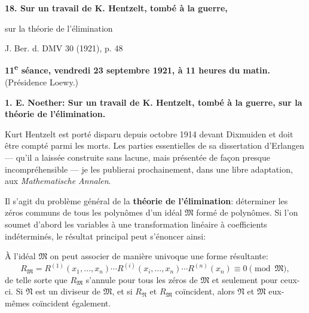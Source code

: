 \begin{center}
{\Large\bfseries 18. Sur un travail de K. Hentzelt, tombé à la guerre,\par sur la théorie de l'élimination}\par
\vspace{1.2em}
J. Ber. d. DMV 30 (1921), p. 48
\end{center}

\begin{center}
\textbf{11\textsuperscript{e} séance, vendredi 23 septembre 1921, à 11 heures du matin.}\\
(Présidence Loewy.)
\end{center}

\textbf{1. E. Noether: Sur un travail de K. Hentzelt, tombé à la guerre, sur la théorie de l'élimination.}

Kurt Hentzelt est porté disparu depuis octobre 1914 devant Dixmuiden et doit être compté parmi les morts. Les parties essentielles de sa dissertation d'Erlangen --- qu'il a laissée construite sans lacune, mais présentée de façon presque incompréhensible --- je les publierai prochainement, dans une libre adaptation, aux \emph{Mathematische Annalen}.

Il s'agit du problème général de la \textbf{théorie de l'élimination}: déterminer les zéros communs de tous les polynômes d'un idéal $\mathfrak M$ formé de polynômes. Si l'on soumet d'abord les variables à une transformation linéaire à coefficients indéterminés, le résultat principal peut s'énoncer ainsi:

À l'idéal $\mathfrak M$ on peut associer de manière univoque une forme résultante:
\[
 R_{\mathfrak M}=R^{(1)}(x_1,\ldots,x_n)\cdots R^{(i)}(x_i,\ldots,x_n)\cdots R^{(n)}(x_n)\equiv0\pmod{\mathfrak M},
\]
 de telle sorte que $R_{\mathfrak M}$ s'annule pour tous les zéros de $\mathfrak M$ et seulement pour ceux-ci. Si $\mathfrak N$ est un diviseur de $\mathfrak M$, et si $R_{\mathfrak N}$ et $R_{\mathfrak M}$ coïncident, alors $\mathfrak N$ et $\mathfrak M$ eux-mêmes coïncident également.

